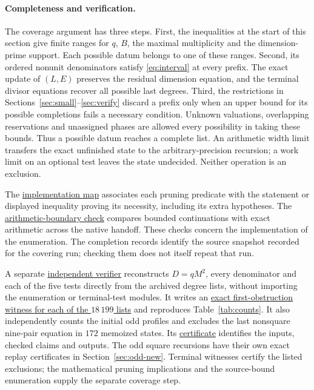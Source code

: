 \documentclass[11pt]{amsart}
\numberwithin{equation}{section}
\theoremstyle{definition}
\theoremstyle{plain}
\newcommand{\supfile}[2]{\href{run:rank-bound-supplement/#1}{#2}}
\begin{document}
\paragraph{Completeness and verification.}
The coverage argument has three steps. First, the inequalities at the
start of this section give finite ranges for $q$, $B$, the maximal
multiplicity and the dimension-prime support. Each possible datum
belongs to one of these ranges. Second, its ordered nonunit
denominators satisfy \eqref{eq:interval} at every prefix. The exact
update of $(L,E)$ preserves the residual dimension equation, and the
terminal divisor equations recover all possible last degrees. Third,
the restrictions in Sections~\ref{sec:small}--\ref{sec:verify} discard
a prefix only when an upper bound for its possible completions fails
a necessary condition. Unknown valuations, overlapping reservations
and unassigned phases are allowed every possibility in taking these
bounds. Thus a possible datum reaches a complete list. An arithmetic
width limit transfers the exact unfinished state to the
arbitrary-precision recursion; a work limit on an optional test leaves
the state undecided. Neither operation is an exclusion.

The \supfile{proof-map.md}{implementation map} associates each pruning
predicate with the statement or displayed inequality proving its
necessity, including its extra hypotheses. The
\supfile{verification/native_boundary/check.py}{arithmetic-boundary check}
compares bounded continuations with exact arithmetic across the native
handoff. These checks concern the implementation of the enumeration.
The completion records identify the source snapshot recorded for the covering run;
checking them does not itself repeat that run.

A separate \supfile{verification/independent/check.py}{independent verifier}
reconstructs $D=qM^2$, every denominator and each of the five tests
directly from the archived degree lists, without importing the
enumeration or terminal-test modules. It writes an
\supfile{verification/independent/terminal-witnesses.jsonl.gz}{exact
first-obstruction witness for each of the $18\,199$ lists} and
reproduces Table~\ref{tab:counts}. It also independently counts the
initial odd profiles and excludes the last nonsquare nine-pair equation
in $172$ memoized states. Its
\supfile{verification/independent/certificate.json}{certificate}
identifies the inputs, checked claims and outputs. The odd square
recursions have their own exact replay certificates in
Section~\ref{sec:odd-new}. Terminal witnesses certify the listed
exclusions; the mathematical pruning implications and the source-bound
enumeration supply the separate coverage step.
\end{document}
